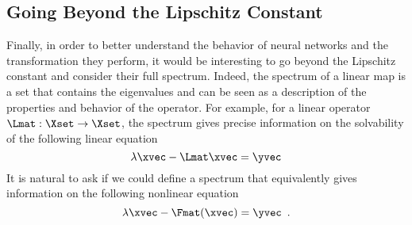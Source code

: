 %
%
%






\subsection{Going Beyond the Lipschitz Constant} 

Finally, in order to better understand the behavior of neural networks and the transformation they perform, it would be interesting to go beyond the Lipschitz constant and consider their full spectrum.
Indeed, the spectrum of a linear map is a set that contains the eigenvalues and can be seen as a description of the properties and behavior of the operator.
For example, for a linear operator $\Lmat: \Xset \rightarrow \Xset$, the spectrum gives precise information on the solvability of the following linear equation
\begin{equation}
  \lambda \xvec - \Lmat \xvec = \yvec
\end{equation}
It is natural to ask if we could define a spectrum that equivalently gives information on the following nonlinear equation
\begin{equation}
  \lambda \xvec - \Fmat(\xvec) = \yvec \enspace.
\end{equation}

